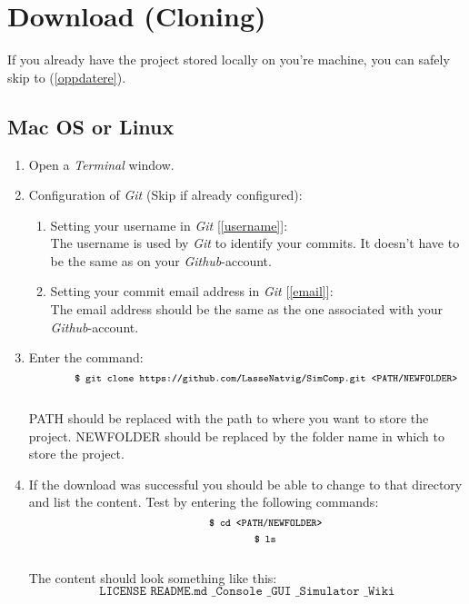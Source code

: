 \section{Download (Cloning)}
\label{nedlasting}
If you already have the project stored locally on you're machine, you can safely skip to (\ref{oppdatere}).
\subsection{Mac OS or Linux}
\begin{enumerate}
    \item Open a \textit{Terminal} window.
    \item Configuration of \textit{Git} (Skip if already configured):
        \begin{enumerate}
            \item Setting your username in \textit{Git} [\ref{username}]:
            \\The username is used by \textit{Git} to identify your commits. It doesn't have to be the same as on your \textit{Github}-account.
            \item Setting your commit email address in \textit{Git} [\ref{email}]:
            \\The email address should be the same as the one associated with your \textit{Github}-account.
        \end{enumerate}
    \item Enter the command:
    \\
    $$\shellcmd{git clone https://github.com/LasseNatvig/SimComp.git <PATH/NEWFOLDER>}$$
    \\
    PATH should be replaced with the path to where you want to store the project. NEWFOLDER should be replaced by the folder name in which to store the project.
    \item If the download was successful you should be able to change to that directory and list the content. Test by entering the following commands:\\
    $$\shellcmd{cd <PATH/NEWFOLDER>}$$
    $$\shellcmd{ls}$$\\
    The content should look something like this:\\
    $$\texttt{LICENSE  README.md   \_Console   \_GUI   \_Simulator   \_Wiki}$$\\
    
\end{enumerate}

